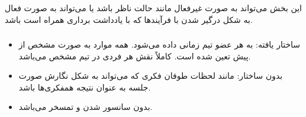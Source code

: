 این بخش می‌تواند به صورت غیرفعال مانند حالت ناظر باشد یا می‌تواند به صورت فعال
به شکل درگیر شدن با فرآیند‌ها که با یادداشت برداری همراه است باشد.

\subsubsection{}

\begin{itemize}
    \item ساختار یافته: به هر عضو تیم زمانی داده می‌شود. همه موارد به صورت مشخص
    از پیش تعین شده است. کاملاً نقش هر فردی در تیم مشخص می‌باشد.
    \item بدون ساختار: مانند لحظات طوفان فکری که می‌تواند به شکل نگارش صورت جلسه
    به عنوان نتیجه همفکری‌ها باشد.
    \item بدون سانسور شدن و تمسخر می‌باشد.
\end{itemize}
